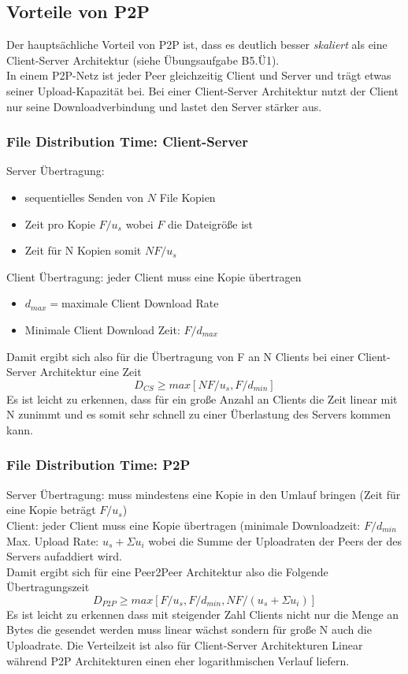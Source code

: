 \subsection{Vorteile von P2P}
Der hauptsächliche Vorteil von P2P ist, dass es deutlich besser \emph{skaliert} als eine Client-Server Architektur (siehe Übungsaufgabe B5.Ü1).\\
\noindent In einem P2P-Netz ist jeder Peer gleichzeitig Client und Server und trägt etwas seiner Upload-Kapazität bei. Bei einer Client-Server Architektur nutzt der Client nur seine Downloadverbindung und lastet den Server stärker aus.

\subsubsection{File Distribution Time: Client-Server}
\noindent Server Übertragung:
\begin{itemize}
    \item sequentielles Senden von $N$ File Kopien
    \item Zeit pro Kopie $F/u_s$ wobei $F$ die Dateigröße ist
    \item Zeit für N Kopien somit $NF/u_s$
\end{itemize}
\noindent Client Übertragung: jeder Client muss eine Kopie übertragen
\begin{itemize}
    \item $d_{max} = $maximale Client Download Rate
    \item Minimale Client Download Zeit: $F/d_{max}$
\end{itemize}

Damit ergibt sich also für die Übertragung von F an N Clients bei einer Client-Server Architektur eine Zeit
\begin{equation}
    D_{CS} \geq max[NF/u_s,F/d_{min}]
\end{equation}
Es ist leicht zu erkennen, dass für ein große Anzahl an Clients die Zeit linear mit N zunimmt und es somit sehr schnell zu einer Überlastung des Servers kommen kann.

\subsubsection{File Distribution Time: P2P}
Server Übertragung: muss mindestens eine Kopie in den Umlauf bringen (Zeit für eine Kopie beträgt $F/u_s$)\\
\noindent Client: jeder Client muss eine Kopie übertragen (minimale Downloadzeit: $F/d_{min}$\\
\noindent Max. Upload Rate: $u_s + \Sigma u_i$ wobei die Summe der Uploadraten der Peers der des Servers aufaddiert wird.\\
Damit ergibt sich für eine Peer2Peer Architektur also die Folgende Übertragungszeit
\begin{equation}
    D_{P2P} \geq max[F/u_s, F/d_{min},NF/(u_s + \Sigma u_i)]
\end{equation}
Es ist leicht zu erkennen dass mit steigender Zahl Clients nicht nur die Menge an Bytes die gesendet werden muss linear wächst sondern für große N auch die Uploadrate. Die Verteilzeit ist also für Client-Server Architekturen Linear während P2P Architekturen einen eher logarithmischen Verlauf liefern.
